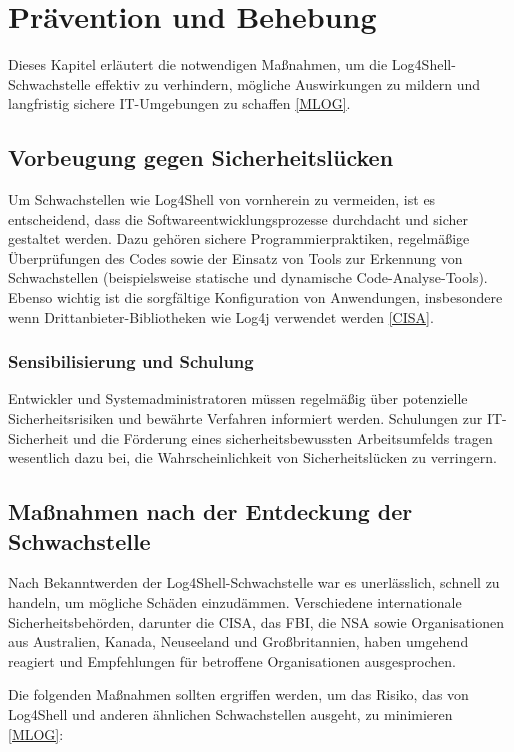 \chapter{Prävention und Behebung}

Dieses Kapitel erläutert die notwendigen Maßnahmen, um die Log4Shell-Schwachstelle effektiv zu verhindern, mögliche Auswirkungen zu mildern und langfristig sichere IT-Umgebungen zu schaffen \hyperref[bib:MLOG]{[MLOG]}.

\section{Vorbeugung gegen Sicherheitslücken}

Um Schwachstellen wie Log4Shell von vornherein zu vermeiden, ist es entscheidend, dass die Softwareentwicklungsprozesse durchdacht und sicher gestaltet werden. Dazu gehören sichere Programmierpraktiken, regelmäßige Überprüfungen des Codes sowie der Einsatz von Tools zur Erkennung von Schwachstellen (beispielsweise statische und dynamische Code-Analyse-Tools). Ebenso wichtig ist die sorgfältige Konfiguration von Anwendungen, insbesondere wenn Drittanbieter-Bibliotheken wie Log4j verwendet werden \hyperref[bib:CISA]{[CISA]}.

\subsection{Sensibilisierung und Schulung}

Entwickler und Systemadministratoren müssen regelmäßig über potenzielle Sicherheitsrisiken und bewährte Verfahren informiert werden. Schulungen zur IT-Sicherheit und die Förderung eines sicherheitsbewussten Arbeitsumfelds tragen wesentlich dazu bei, die Wahrscheinlichkeit von Sicherheitslücken zu verringern.

\section{Maßnahmen nach der Entdeckung der Schwachstelle}

Nach Bekanntwerden der Log4Shell-Schwachstelle war es unerlässlich, schnell zu handeln, um mögliche Schäden einzudämmen. Verschiedene internationale Sicherheitsbehörden, darunter die CISA, das FBI, die NSA sowie Organisationen aus Australien, Kanada, Neuseeland und Großbritannien, haben umgehend reagiert und Empfehlungen für betroffene Organisationen ausgesprochen.

Die folgenden Maßnahmen sollten ergriffen werden, um das Risiko, das von Log4Shell und anderen ähnlichen Schwachstellen ausgeht, zu minimieren \hyperref[bib:MLOG]{[MLOG]}:

